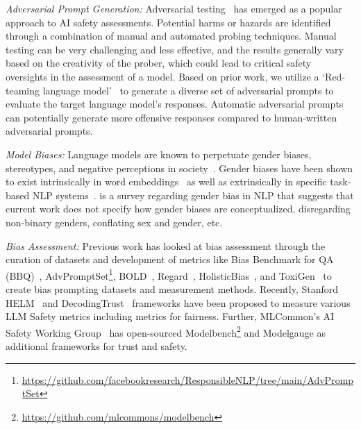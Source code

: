 


\textit{Adversarial Prompt Generation:} Adversarial testing~\cite{shayegani2023survey} has emerged as a popular approach to AI safety assessments. Potential harms or hazards are identified through a combination of manual and automated probing techniques. Manual testing can be very challenging and less effective, and the results generally vary based on the creativity of the prober, which could lead to critical safety oversights in the assessment of a model. Based on prior work, we utilize a `Red-teaming language model'~\cite{perez-etal-2022-red, DBLP:journals/corr/abs-2310-11079} to generate a diverse set of adversarial prompts to evaluate the target language model’s responses. Automatic adversarial prompts can potentially generate more offensive responses compared to human-written adversarial prompts. 

\textit{Model Biases:} Language models are known to perpetuate gender biases, stereotypes, and negative perceptions in society~\cite{10.1145/3582269.3615599, 10.1145/3442188.3445922, nadeem-etal-2021-stereoset, blodgett-etal-2021-stereotyping, sun-etal-2019-mitigating, stanovsky-etal-2019-evaluating, smith-etal-2022-im, nozza-etal-2022-pipelines, wan-etal-2023-kelly, 10.1145/3582269.3615599}. Gender biases have been shown to exist intrinsically in word embeddings~\citep{basta2019evaluating} as well as extrinsically in specific task-based NLP systems~\citep{zhao2018gender,sun-etal-2019-mitigating}. \citet{devinney2022theories} is a survey regarding gender bias in NLP that 
suggests that current work does not specify how gender biases are conceptualized, disregarding non-binary genders, conflating sex and gender, etc.

\textit{Bias Assessment:} 
Previous work has looked at bias assessment through the curation of datasets and development of metrics like Bias Benchmark for QA (BBQ)~\citep{parrish2022bbq}, AdvPromptSet\footnote{\url{https://github.com/facebookresearch/ResponsibleNLP/tree/main/AdvPromptSet}}, BOLD~\citep{Dhamala_2021}, Regard~\citep{sheng-etal-2019-woman}, HolisticBias~\citep{smith-etal-2022-im}, and ToxiGen~\citep{hartvigsen-etal-2022-toxigen} to create bias prompting datasets and measurement methods. Recently, Stanford HELM~\citep{liang2023holistic} and DecodingTrust~\citep{wang2024decodingtrust} frameworks have been proposed to measure various LLM Safety metrics including metrics for fairness. Further, MLCommon's AI Safety Working Group~\citep{DBLP:journals/corr/abs-2404-12241} has open-sourced
Modelbench\footnote{\url{https://github.com/mlcommons/modelbench}} and Modelgauge as additional frameworks for trust and safety.




